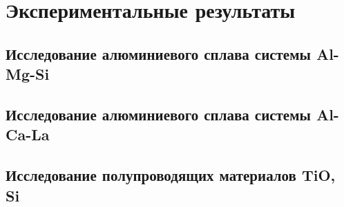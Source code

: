 \chapter{Экспериментальные результаты}\label{ch:ch4}

\section{Исследование алюминиевого сплава системы Al-Mg-Si}\label{sec:ch4/sect1}


\section{Исследование алюминиевого сплава системы Al-Ca-La}\label{sec:ch4/sect2}

\section{Исследование полупроводящих материалов TiO, Si}\label{sec:ch4/sect1}